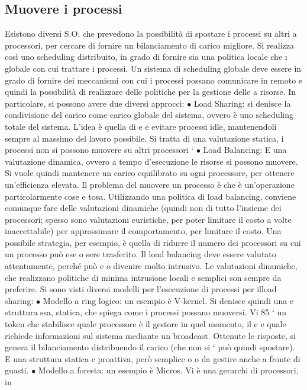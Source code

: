 \subsection{Muovere i processi}
Esistono diversi S.O. che prevedono la possibilità di spostare i processi su altri
a
processori, per cercare di fornire un bilanciamento di carico migliore. Si realizza
così uno scheduling distribuito, in grado di fornire sia una politica locale che
\i{}
globale con cui trattare i processi. Un sistema di scheduling globale deve essere
in grado di fornire dei meccanismi con cui i processi possano comunicare in
remoto e quindi la possibilità di realizzare delle politiche per la gestione delle
a
risorse.
In particolare, si possono avere due diversi approcci:
$\bullet$ Load Sharing: si denisce la condivisione del carico come carico globale
del sistema, ovvero è uno scheduling totale del sistema. L'idea è quella di
e
e
evitare processi idle, mantenendoli sempre al massimo del lavoro possibile.
Si tratta di una valutazione statica, i processi non si possono muovere su
altri processori
`
$\bullet$ Load Balancing: E una valutazione dinamica, ovvero a tempo d'esecuzione
le risorse si possono muovere. Si vuole quindi mantenere un carico equilibrato su ogni processore, per ottenere
un'efficienza elevata.
Il problema del muovere un processo è che è un'operazione particolarmente cose
e
tosa. Utilizzando una politica di load balancing, conviene comunque fare delle
valutazioni dinamiche (quindi non di tutto l'insieme dei processori; spesso sono
valutazioni euristiche, per poter limitare il costo a volte inaccettabile) per approssimare il comportamento, per
limitare il costo. Una possibile strategia, per
esempio, è quella di ridurre il numero dei processori su cui un processo può ese
o
sere trasferito. Il load balancing deve essere valutato attentamente, perché può
e o
divenire molto intrusivo. Le valutazioni dinamiche, che realizzano politiche di
minima intrusione locali e semplici son sempre da preferire.
Si sono visti diversi modelli per l'esecuzione di processi per ilload sharing:
$\bullet$ Modello a ring logico: un esempio è V-kernel. Si denisce quindi una
e
struttura ssa, statica, che spiega come i processi possano muoversi. Vi
85
` un token che stabilisce quale processore è il gestore in quel momento, il
e
e
quale richiede informazioni sul sistema mediante un broadcast. Ottenute
le risposte, si genera il bilanciamento distribuendo il carico (che non si
`
può quindi spostare). E una struttura statica e proattiva, però semplice
o
o
da gestire anche a fronte di guasti.
$\bullet$ Modello a foresta: un esempio è Micros. Vi è una gerarchi di processori, in
